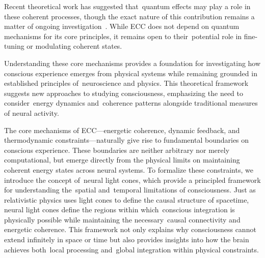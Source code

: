 Recent theoretical work has suggested that~quantum effects may play a role in these coherent processes, though the exact nature of this contribution remains a matter of ongoing investigation~\cite{barrett2014}. While ECC does not depend on quantum mechanisms for its core principles, it remains open to their~potential role in fine-tuning or modulating coherent states.

Understanding these core mechanisms provides a foundation for investigating how conscious experience emerges from physical systems while remaining grounded in established principles of~neuroscience and physics. This theoretical framework suggests new approaches to studying consciousness, emphasizing the need to consider~energy dynamics and~coherence patterns alongside traditional measures of neural activity.

The core mechanisms of ECC—energetic coherence, dynamic feedback, and thermodynamic constraints—naturally give rise to fundamental boundaries on conscious experience. These boundaries are neither arbitrary nor merely computational, but emerge directly from the physical limits on maintaining coherent energy states across neural systems. To formalize these constraints, we introduce the concept of~neural light cones, which provide a principled framework for understanding the~spatial and~temporal limitations of consciousness. Just as relativistic physics uses light cones to define the causal structure of spacetime, neural light cones define the regions within which~conscious integration is physically possible while maintaining the necessary~causal connectivity and energetic coherence. This framework not only explains why consciousness cannot extend infinitely in space or time but also provides insights into how the brain achieves both~local processing and~global integration within physical constraints.

